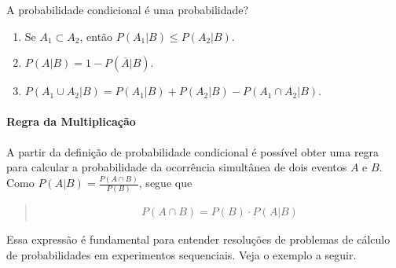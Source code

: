 \begin{example} {A probabilidade condicional é uma probabilidade?}
\begin{enumerate}
\item {} 
Se \(A_1\subset A_2\),  então \(P(A_1|B)\leq P(A_2|B)\).

\item {} 
\(P(A|B)=1-P(\overline{A}|B)\).

\item {} 
\(P(A_1 \cup A_2|B)=P(A_1|B)+P(A_2|B)-P(A_1\cap A_2|B)\).

\end{enumerate}
\end{example}


\paragraph{Regra da Multiplicação}

A partir da definição de probabilidade condicional é possível obter uma regra para calcular a probabilidade da ocorrência simultânea de dois eventos \(A\)  e \(B\). Como \(\displaystyle{P(A|B)=\frac{P(A\cap B)}{P(B)}}\), segue que
\begin{quote}
\begin{equation*}
\begin{split}P(A\cap B)=P(B)\cdot P(A|B)\end{split}
\end{equation*}\end{quote}

Essa expressão é fundamental para entender resoluções de problemas de cálculo de probabilidades em experimentos sequenciais. Veja o exemplo a seguir.

